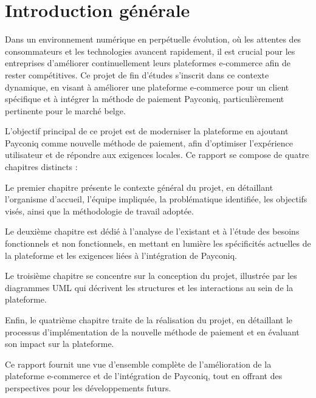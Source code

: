 \chapter*{Introduction générale}


Dans un environnement numérique en perpétuelle évolution, où les attentes des consommateurs et les technologies avancent rapidement, il est crucial pour les entreprises d'améliorer continuellement leurs plateformes e-commerce afin de rester compétitives. Ce projet de fin d'études s'inscrit dans ce contexte dynamique, en visant à améliorer une plateforme e-commerce pour un client spécifique et à intégrer la méthode de paiement Payconiq, particulièrement pertinente pour le marché belge.

\vspace{10pt}

L’objectif principal de ce projet est de moderniser la plateforme en ajoutant Payconiq comme nouvelle méthode de paiement, afin d'optimiser l'expérience utilisateur et de répondre aux exigences locales. Ce rapport se compose de quatre chapitres distincts : 

Le premier chapitre présente le contexte général du projet, en détaillant l'organisme d'accueil, l'équipe impliquée, la problématique identifiée, les objectifs visés, ainsi que la méthodologie de travail adoptée. 

Le deuxième chapitre est dédié à l'analyse de l'existant et à l'étude des besoins fonctionnels et non fonctionnels, en mettant en lumière les spécificités actuelles de la plateforme et les exigences liées à l'intégration de Payconiq.

Le troisième chapitre se concentre sur la conception du projet, illustrée par les diagrammes UML qui décrivent les structures et les interactions au sein de la plateforme.

Enfin, le quatrième chapitre traite de la réalisation du projet, en détaillant le processus d'implémentation de la nouvelle méthode de paiement et en évaluant son impact sur la plateforme.

\vspace{10pt}

Ce rapport fournit une vue d'ensemble complète de l'amélioration de la plateforme e-commerce et de l'intégration de Payconiq, tout en offrant des perspectives pour les développements futurs.

